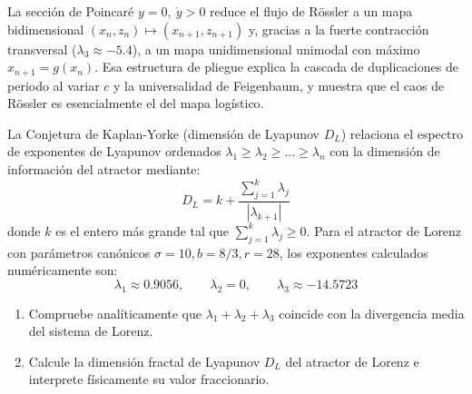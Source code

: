 \documentclass[11pt,a4paper]{article}
\newenvironment{conclusion}[1][Interpretación Dinámica y Conclusión]{%
    \vspace{2mm}%
    \noindent{\large\textbf{Conclusión:}}\par\vspace{1.5mm}%
}{%
    \par\vspace{3mm}%
}
\begin{document}
\begin{conclusion}
La sección de Poincaré $y = 0,\ \dot{y} > 0$ reduce el flujo de Rössler a un mapa bidimensional $(x_n, z_n) \mapsto (x_{n+1}, z_{n+1})$ y, gracias a la fuerte contracción transversal ($\lambda_3 \approx -5.4$), a un mapa unidimensional unimodal con máximo $x_{n+1} = g(x_n)$. Esa estructura de pliegue explica la cascada de duplicaciones de periodo al variar $c$ y la universalidad de Feigenbaum, y muestra que el caos de Rössler es esencialmente el del mapa logístico.
\end{conclusion}

\vspace{3mm}

\begin{problema}[Problema 5.5]
La Conjetura de Kaplan-Yorke (dimensión de Lyapunov $D_L$) relaciona el espectro de exponentes de Lyapunov ordenados $\lambda_1 \ge \lambda_2 \ge \dots \ge \lambda_n$ con la dimensión de información del atractor mediante:
\[
D_L = k + \frac{\sum_{j=1}^k \lambda_j}{|\lambda_{k+1}|}
\]
donde $k$ es el entero más grande tal que $\sum_{j=1}^k \lambda_j \ge 0$.
Para el atractor de Lorenz con parámetros canónicos $\sigma = 10, b = 8/3, r = 28$, los exponentes calculados numéricamente son:
\[
\lambda_1 \approx 0.9056, \qquad \lambda_2 = 0, \qquad \lambda_3 \approx -14.5723
\]
\begin{enumerate}[label=\textbf{\alph*)}]
    \item Compruebe analíticamente que $\lambda_1 + \lambda_2 + \lambda_3$ coincide con la divergencia media del sistema de Lorenz.
    \item Calcule la dimensión fractal de Lyapunov $D_L$ del atractor de Lorenz e interprete físicamente su valor fraccionario.
\end{enumerate}
\end{problema}
\end{document}
